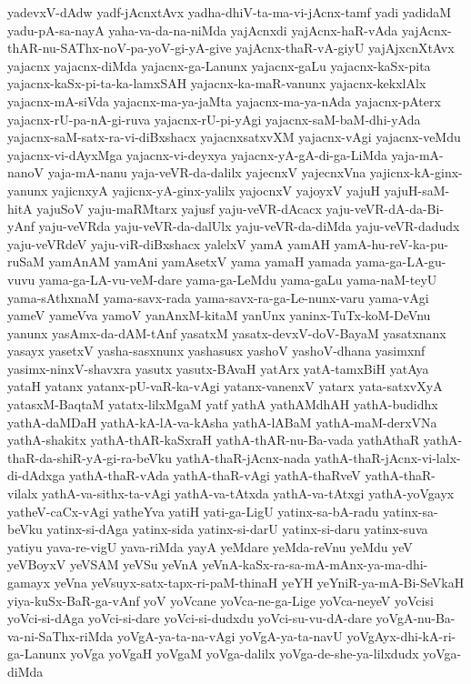 {yadevxV-dAdw
yadf-jAcnxtAvx
yadha-dhiV-ta-ma-vi-jAcnx-tamf
yadi
yadidaM
yadu-pA-sa-nayA
yaha-va-da-na-niMda
yajAcnxdi
yajAcnx-haR-vAda
yajAcnx-thAR-nu-SAThx-noV-pa-yoV-gi-yA-give
yajAcnx-thaR-vA-giyU
yajAjxcnXtAvx
yajacnx
yajacnx-diMda
yajacnx-ga-Lanunx
yajacnx-gaLu
yajacnx-kaSx-pita
yajacnx-kaSx-pi-ta-ka-lamxSAH
yajacnx-ka-maR-vanunx
yajacnx-kekxlAlx
yajacnx-mA-siVda
yajacnx-ma-ya-jaMta
yajacnx-ma-ya-nAda
yajacnx-pAterx
yajacnx-rU-pa-nA-gi-ruva
yajacnx-rU-pi-yAgi
yajacnx-saM-baM-dhi-yAda
yajacnx-saM-satx-ra-vi-diBxshacx
yajacnxsatxvXM
yajacnx-vAgi
yajacnx-veMdu
yajacnx-vi-dAyxMga
yajacnx-vi-deyxya
yajacnx-yA-gA-di-ga-LiMda
yaja-mA-nanoV
yaja-mA-nanu
yaja-veVR-da-dalilx
yajecnxV
yajecnxVna
yajicnx-kA-ginx-yanunx
yajicnxyA
yajicnx-yA-ginx-yalilx
yajocnxV
yajoyxV
yajuH
yajuH-saM-hitA
yajuSoV
yaju-maRMtarx
yajusf
yaju-veVR-dAcacx
yaju-veVR-dA-da-Bi-yAnf
yaju-veVRda
yaju-veVR-da-dalUlx
yaju-veVR-da-diMda
yaju-veVR-dadudx
yaju-veVRdeV
yaju-viR-diBxshacx
yalelxV
yamA
yamAH
yamA-hu-reV-ka-pu-ruSaM
yamAnAM
yamAni
yamAsetxV
yama
yamaH
yamada
yama-ga-LA-gu-vuvu
yama-ga-LA-vu-veM-dare
yama-ga-LeMdu
yama-gaLu
yama-naM-teyU
yama-sAthxnaM
yama-savx-rada
yama-savx-ra-ga-Le-nunx-varu
yama-vAgi
yameV
yameVva
yamoV
yanAnxM-kitaM
yanUnx
yaninx-TuTx-koM-DeVnu
yanunx
yasAmx-da-dAM-tAnf
yasatxM
yasatx-devxV-doV-BayaM
yasatxnanx
yasayx
yasetxV
yasha-sasxnunx
yashasusx
yashoV
yashoV-dhana
yasimxnf
yasimx-ninxV-shavxra
yasutx
yasutx-BAvaH
yatArx
yatA-tamxBiH
yatAya
yataH
yatanx
yatanx-pU-vaR-ka-vAgi
yatanx-vanenxV
yatarx
yata-satxvXyA
yatasxM-BaqtaM
yatatx-lilxMgaM
yatf
yathA
yathAMdhAH
yathA-budidhx
yathA-daMDaH
yathA-kA-lA-va-kAsha
yathA-lABaM
yathA-maM-derxVNa
yathA-shakitx
yathA-thAR-kaSxraH
yathA-thAR-nu-Ba-vada
yathAthaR
yathA-thaR-da-shiR-yA-gi-ra-beVku
yathA-thaR-jAcnx-nada
yathA-thaR-jAcnx-vi-lalx-di-dAdxga
yathA-thaR-vAda
yathA-thaR-vAgi
yathA-thaRveV
yathA-thaR-vilalx
yathA-va-sithx-ta-vAgi
yathA-va-tAtxda
yathA-va-tAtxgi
yathA-yoVgayx
yatheV-caCx-vAgi
yatheYva
yatiH
yati-ga-LigU
yatinx-sa-bA-radu
yatinx-sa-beVku
yatinx-si-dAga
yatinx-sida
yatinx-si-darU
yatinx-si-daru
yatinx-suva
yatiyu
yava-re-vigU
yava-riMda
yayA
yeMdare
yeMda-reVnu
yeMdu
yeV
yeVBoyxV
yeVSAM
yeVSu
yeVnA
yeVnA-kaSx-ra-sa-mA-mAnx-ya-ma-dhi-gamayx
yeVna
yeVsuyx-satx-tapx-ri-paM-thinaH
yeYH
yeYniR-ya-mA-Bi-SeVkaH
yiya-kuSx-BaR-ga-vAnf
yoV
yoVcane
yoVca-ne-ga-Lige
yoVca-neyeV
yoVcisi
yoVci-si-dAga
yoVci-si-dare
yoVci-si-dudxdu
yoVci-su-vu-dA-dare
yoVgA-nu-Ba-va-ni-SaThx-riMda
yoVgA-ya-ta-na-vAgi
yoVgA-ya-ta-navU
yoVgAyx-dhi-kA-ri-ga-Lanunx
yoVga
yoVgaH
yoVgaM
yoVga-dalilx
yoVga-de-she-ya-lilxdudx
yoVga-diMda
}
